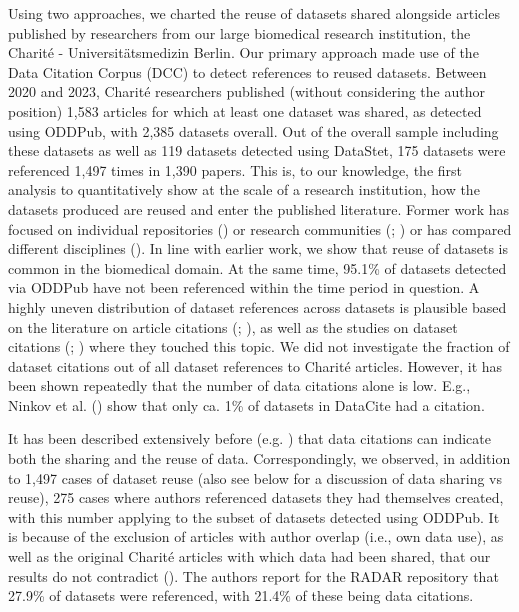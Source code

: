 \documentclass[
  letterpaper,
  DIV=11,
  numbers=noendperiod]{scrartcl}
\begin{document}
Using two approaches, we charted the reuse of datasets shared alongside
articles published by researchers from our large biomedical research
institution, the Charité - Universitätsmedizin Berlin. Our primary
approach made use of the Data Citation Corpus (DCC) to detect references
to reused datasets. Between 2020 and 2023, Charité researchers published
(without considering the author position) 1,583 articles for which at
least one dataset was shared, as detected using ODDPub, with 2,385
datasets overall. Out of the overall sample including these datasets as
well as 119 datasets detected using DataStet, 175 datasets were
referenced 1,497 times in 1,390 papers. This is, to our knowledge, the
first analysis to quantitatively show at the scale of a research
institution, how the datasets produced are reused and enter the
published literature. Former work has focused on individual repositories
() or
research communities
(;
) or has compared different disciplines
(). In line with earlier work, we show that reuse of datasets is
common in the biomedical domain. At the same time, 95.1\% of datasets
detected via ODDPub have not been referenced within the time period in
question. A highly uneven distribution of dataset references across
datasets is plausible based on the literature on article citations
(;
), as well as the studies
on dataset citations (; ) where they touched this topic. We did not investigate the
fraction of dataset citations out of all dataset references to Charité
articles. However, it has been shown repeatedly that the number of data
citations alone is low. E.g., Ninkov et al.
() show that only ca. 1\% of datasets in
DataCite had a citation.

It has been described extensively before (e.g.
) that data citations can
indicate both the sharing and the reuse of data. Correspondingly, we
observed, in addition to 1,497 cases of dataset reuse (also see below
for a discussion of data sharing vs reuse), 275 cases where authors
referenced datasets they had themselves created, with this number
applying to the subset of datasets detected using ODDPub. It is because
of the exclusion of articles with author overlap (i.e., own data use),
as well as the original Charité articles with which data had been
shared, that our results do not contradict
(). The
authors report for the RADAR repository that 27.9\% of datasets were
referenced, with 21.4\% of these being data citations.
\end{document}

